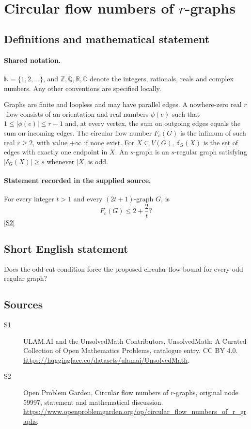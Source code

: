 \documentclass[11pt]{article}
\newcommand{\sref}[2]{\hyperlink{source:#1:#2}{[S#2]}}
\begin{document}
\section{Circular flow numbers of $r$-graphs}\label{statement}

\subsection{Definitions and mathematical statement}

\paragraph{Shared notation.}$\mathbb N=\{1,2,\ldots\}$, and $\mathbb Z,\mathbb Q,\mathbb R,\mathbb C$ denote the integers, rationals, reals and complex numbers. Any other conventions are specified locally.


Graphs are finite and loopless and may have parallel edges. A nowhere-zero real $r$-flow consists of an orientation and real numbers $\phi(e)$ such that $1\le|\phi(e)|\le r-1$ and, at every vertex, the sum on outgoing edges equals the sum on incoming edges. The circular flow number $F_c(G)$ is the infimum of such real $r\ge2$, with value $+\infty$ if none exist. For $X\subseteq V(G)$, $\delta_G(X)$ is the set of edges with exactly one endpoint in $X$. An $s$-graph is an $s$-regular graph satisfying $|\delta_G(X)|\ge s$ whenever $|X|$ is odd.
\paragraph{Statement recorded in the supplied source.}
For every integer $t>1$ and every $(2t+1)$-graph $G$, is \[F_c(G)\le2+\frac2t?\] \sref{statement}{2}
\subsection{Short English statement}
Does the odd-cut condition force the proposed circular-flow bound for every odd regular graph?
\subsection{Sources}
\begin{description}
\item[\hypertarget{source:statement:1}{S1}] ULAM.AI and the UnsolvedMath Contributors, UnsolvedMath: A Curated Collection of Open Mathematics Problems, catalogue entry. CC BY 4.0. \url{https://huggingface.co/datasets/ulamai/UnsolvedMath}.
\item[\hypertarget{source:statement:2}{S2}] Open Problem Garden, Circular flow numbers of $r$-graphs, original node 59997, statement and mathematical discussion. \url{https://www.openproblemgarden.org/op/circular_flow_numbers_of_r_graphs}.
\end{description}
\label{end:statement}
\end{document}
